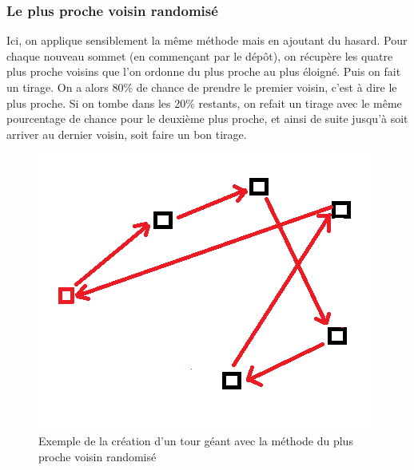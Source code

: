 \documentclass[12pt]{article}
\begin{document}
 \subsubsection{Le plus proche voisin randomisé}
    Ici, on applique sensiblement la même méthode mais en ajoutant du hasard. Pour chaque nouveau sommet (en commençant par le dépôt), on récupère les quatre plus proche voisins que l'on ordonne du plus proche au plus éloigné. Puis on fait un tirage. On a alors 80\% de chance de prendre le premier voisin, c'est à dire le plus proche. Si on tombe dans les 20\% restants, on refait un tirage avec le même pourcentage de chance pour le deuxième plus proche, et ainsi de suite jusqu'à soit arriver au dernier voisin, soit faire un bon tirage.
     \begin{figure}[!h]
	    \centering
	    \includegraphics[scale = 1]{plu_proche_rand.png}
	    \caption{Exemple de la création d'un tour géant avec la méthode du plus proche voisin randomisé}
	    \label{fig3}
	\end{figure}\par
\end{document}
